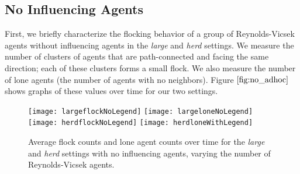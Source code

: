\subsection{No Influencing Agents}

First, we briefly characterize the flocking behavior of a group of Reynolds-Vicsek
agents without influencing agents in the \textit{large} and \textit{herd} settings.
We measure the number of clusters of agents that are path-connected and facing the
same direction; each of these clusters forms a small flock.
We also measure the number of lone agents (the number of agents with no neighbors).
Figure $\ref{fig:no_adhoc}$ shows graphs of these values over time for our two
settings.
\begin{figure}
    \centering
    \texttt{[image: largeflockNoLegend]}
    \texttt{[image: largeloneNoLegend]}
    \texttt{[image: herdflockNoLegend]}
    \texttt{[image: herdloneWithLegend]}
    \caption{Average flock counts and lone agent counts over time for the
    \textit{large} and \textit{herd} settings with no influencing agents,
    varying the number of Reynolds-Vicsek agents.}
    \label{fig:no_adhoc}
\end{figure}

